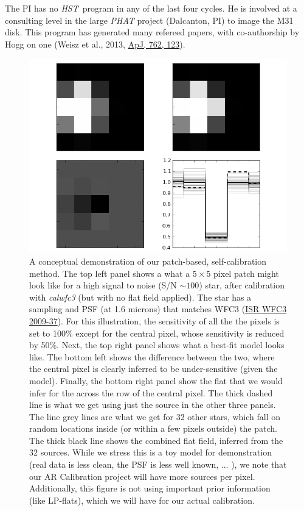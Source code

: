 \documentclass[12pt]{article}
\newcommand{\project}[1]{\textsl{#1}}
\newcommand{\HST}{\project{HST}}
\begin{document}
The PI has no \HST\ program in any of the last four cycles.  He is
involved at a consulting level in the large \project{PHAT} project
(Dalcanton, PI) to image the M31 disk.  This program has generated
many refereed papers, with co-authorship by Hogg on one (Weisz et al.,
2013, \href{http://dx.doi.org/10.1088/0004-637X/762/2/123}{ApJ, 762, 123}).


\begin{figure}
\centering
 \includegraphics[scale=0.75]{toy32.png}
\caption{A conceptual demonstration of our patch-based,
  self-calibration method.  The top left panel shows a what a $5\times5$
  pixel patch might look like for a high signal to noise (S/N $\sim
  100$) star, after
  calibration with \textsl{calwfc3} (but with no flat field applied).
  The star has a sampling and PSF (at 1.6 microns) that matches WFC3
  (\href{http://bit.ly/XFSb1M}{ISR WFC3 2009-37}).  For this
  illustration, the sensitivity of all the the pixels is set to 100\%
  except for the central pixel, whose sensitivity is reduced by 50\%.
  Next, the top right panel shows what a best-fit model looks like.
  The bottom left shows the difference between the two, where the
  central pixel is clearly inferred to be under-sensitive (given the
  model).  Finally, the bottom right panel show the flat that we would
  infer for the across the row of the central pixel.  The thick dashed
  line is what we get using just the source in the other three
  panels.  The line grey lines are what we get for 32 other stars,
  which fall on random locations inside (or within a few pixels
  outside) the patch.  The thick black line shows the combined flat
  field, inferred from the 32 sources.  While we stress this is a toy
  model for demonstration (real data is less clean, the PSF is less
  well known, ... ), we note that our AR Calibration project will have
  more sources per pixel.  Additionally, this figure is not using
  important prior information (like LP-flats), which we will have for
  our actual calibration.}
\label{fig:2D}
\end{figure}




\end{document}
